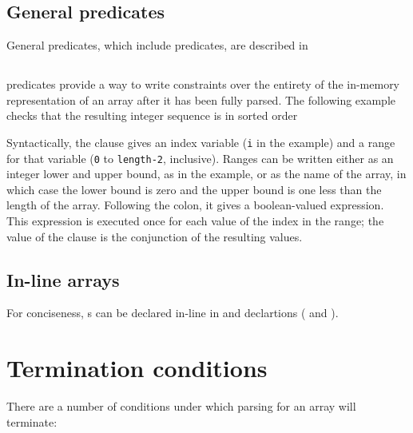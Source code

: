 \subsection{General predicates}
General predicates, which include \Pparsecheck{} predicates, are
described in 

\subsection{\Pforall}
\Pforall{} predicates provide a way to write constraints over the entirety
of the in-memory representation of an array after it has been fully
parsed. The following example checks that the resulting integer
sequence is in sorted order

%
\noindent
Syntactically, the \Pforall{} clause gives an index variable
(\texttt{i} in the example) and a range for that variable (\texttt{0}
to \texttt{length-2}, inclusive).  Ranges can be written either as an
integer lower and upper bound, as in the example, or as the name of
the array, in which case the lower bound is zero and the upper bound
is one less than the length of the array. Following the colon, it gives a
boolean-valued expression. This expression is executed once for each
value of the index in the range;  the value of the clause is the
conjunction of the resulting values.

\subsection{In-line arrays}
For conciseness, \Parray{}s can be declared in-line in \Pstruct{} and
\Punion{} declartions  (\cf{}  and
).

\section{Termination conditions}
There are a number of conditions under which parsing for an array will
terminate:

